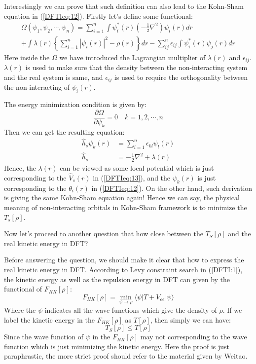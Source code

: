Interestingly we can prove that such definition can also lead to the
Kohn-Sham equation in (\ref{DFTIeq:12}). Firstly let's define some
functional:
\begin{multline}\label{}
\Omega(\psi_{1}, \psi_{2}, \cdots, \psi_{n}) =
\sum_{i=1}^{n}\int\psi^{*}_{i}(r)
    \left(-\frac{1}{2}\nabla^{2}\right)\psi_{i}(r)dr \\
    +
\int\lambda(r)\left\{\sum_{i=1}^{n}|\psi_{i}(r)|^{2}
-\rho(r)\right\}dr -
\sum_{ij}^{n}\epsilon_{ij}\int\psi^{*}_{i}(r)\psi_{j}(r)dr
\end{multline}
Here inside the $\Omega$ we have introduced the Lagrangian
multiplier of $\lambda(r)$ and $\epsilon_{ij}$. $\lambda(r)$ is used
to make sure that the density between the non-interacting system and
the real system is same, and $\epsilon_{ij}$ is used to require the
orthogonality between the non-interacting of $\psi_{i}(r)$.

The energy minimization condition is given by:
\begin{equation}\label{}
\frac{\partial \Omega}{\partial \psi_{k}} = 0 \quad k=1, 2, \cdots,
n
\end{equation}
Then we can get the resulting equation:
\begin{equation}\label{DFTIeq:16}
\begin{split}
  \hat{h}_{s}\psi_{k}(r) &= \sum_{l=1}^{n}\epsilon_{kl}\psi_{l}(r) \\
    \hat{h}_{s} &=-\frac{1}{2}\nabla^{2} + \lambda(r)
\end{split}
\end{equation}
Hence, the $\lambda(r)$ can be viewed as some local potential which
is just corresponding to the $\hat{V}_{s}(r)$ in (\ref{DFTIeq:13}),
and the $\psi_{k}(r)$ is just corresponding to the $\theta_{i}(r)$
in (\ref{DFTIeq:12}). On the other hand, such derivation is giving
the same Kohn-Sham equation again! Hence we can say, the physical 
meaning of non-interacting orbitals in Kohn-Sham framework is to 
minimize the $T_{s}[\rho]$.

Now let's proceed to another question that how close between the
$T_{S}[\rho]$ and the real kinetic energy in DFT?

Before answering the question, we should make it clear that how to
express the real kinetic energy in DFT. According to Levy constraint
search in (\ref{DFTI:1}), the kinetic energy as well as the
repulsion energy in DFT can given by the functional of
$F_{HK}[\rho]$:
\begin{equation}\label{}
F_{HK}[\rho] = \min_{\psi\rightarrow\rho}
\langle\psi|T+V_{ee}|\psi\rangle
\end{equation}
Where the $\psi$ indicates all the wave functions which give the
density of $\rho$. If we label the kinetic energy in the
$F_{HK}[\rho]$ as $T[\rho]$, then simply we can have:
\begin{equation}\label{DFTIeq:14}
T_{S}[\rho] \leq T[\rho]
\end{equation}
Since the wave function of $\psi$ in the $F_{HK}[\rho]$ may not
corresponding to the wave function which is just minimizing the
kinetic energy. Here the proof is just paraphrastic, the more strict
proof should refer to the material given by Weitao\cite{weitaoYang}.

